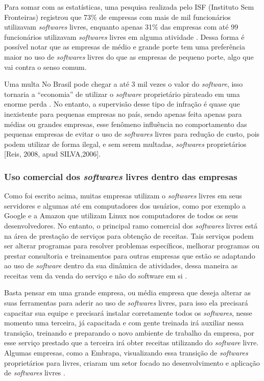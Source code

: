 \documentclass[12pt]{article}
\begin{document}
Para somar com as estatísticas, uma pesquisa realizada pelo ISF (Instituto Sem Fronteiras) registrou que 73\% de empresas com mais de mil funcionários utilizavam \textit{softwares} livres, enquanto apenas 31\% das empresas com até 99 funcionários utilizavam \textit{softwares} livres em alguma atividade \cite{serpro2008}. Dessa forma é possível notar que as empresas de médio e grande porte tem uma preferência maior no uso de \textit{softwares} livres do que as empresas de pequeno porte, algo que vai contra o senso comum.

Uma multa No Brasil pode chegar a até 3 mil vezes o valor do \textit{software}, isso tornaria a “economia” de utilizar o \textit{software} proprietário pirateado em uma enorme perda \cite{serpro2008}.  No entanto, a supervisão desse tipo de infração é quase que inexistente para pequenas empresas no país, sendo apenas feita apenas para médias ou grandes empresas, esse fenômeno influência no comportamento das pequenas empresas de evitar o uso de \textit{softwares} livres para redução de custo, pois podem utilizar de forma ilegal, e sem serem multadas, \textit{softwares} proprietários [Reis, 2008, apud SILVA,2006].

\subsubsection{Uso comercial dos \textit{softwares} livres dentro das empresas}

Como foi escrito acima, muitas empresas utilizam o \textit{softwares} livres em seus servidores e algumas até em computadores dos usuários, como por exemplo a Google e a Amazon que utilizam Linux nos computadores de todos os seus desenvolvedores.  No entanto, o principal ramo comercial dos \textit{softwares} livres está na área de prestação de serviços para obtenção de receitas. Tais serviços podem ser alterar programas para resolver problemas específicos, melhorar programas ou prestar consultoria e treinamentos para outras empresas que estão se adaptando ao uso de \textit{software} dentro da sua dinâmica de atividades, dessa maneira as receitas vem da venda do serviço e não do software em si \cite{saleh2004}.

Basta pensar em uma grande empresa, ou média empresa que deseja alterar as suas ferramentas para aderir ao uso de \textit{softwares} livres, para isso ela precisará capacitar sua equipe e precisará instalar corretamente todos os \textit{softwares}, nesse momento uma terceira, já capacitada e com gente treinada irá auxiliar nessa transição, treinando e preparando o novo ambiente de trabalho da empresa, por esse serviço prestado que a terceira irá obter receitas utilizando do \textit{software} livre. Algumas empresas, como a Embrapa, visualizando essa transição de \textit{softwares} proprietários para livres, criaram um setor focado no desenvolvimento e aplicação de \textit{softwares} livres \cite{embrapa2020}.
\end{document}

